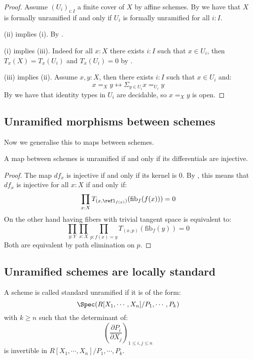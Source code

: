 \begin{proof}
Assume $(U_i)_{i:I}$ a finite cover of $X$ by affine schemes. By  we have that $X$ is formally unramified if and only if $U_i$ is formally unramified for all $i:I$.

(ii) implies (i). By .

(i) implies (iii). Indeed for all $x:X$ there exists $i:I$ such that $x\in U_i$, then $T_x(X) = T_x(U_i)$ and $T_x(U_i) = 0$ by .

(iii) implies (ii). Assume $x,y:X$, then there exists $i:I$ such that $x\in U_i$ and:
\[x=_Xy \leftrightarrow \Sigma_{y\in U_i} x=_{U_i} y\]
By  we have that identity types in $U_i$ are decidable, so $x=_Xy$ is open.
\end{proof}

\subsection{Unramified morphisms between schemes}

Now we generalise this to maps between schemes.

\begin{proposition}\label{unramified-map-characterisation}
A map between schemes is unramified if and only if its differentials are injective. 
\end{proposition}

\begin{proof}
The map $df_x$ is injective if and only if its kernel is $0$. By , this means that $df_x$ is injective for all $x:X$ if and only if:
\[
\prod_{x:X}T_{(x,\refl_{f(x)})}(\mathrm{fib}_f(f(x)))=0
\]
On the other hand having fibers with trivial tangent space is equivalent to:
\[
\prod_{y:Y}\prod_{x:X}\prod_{p:f(x)=y} T_{(x,p)}(\mathrm{fib}_f(y)) = 0
\]
Both are equivalent by path elimination on $p$.
\end{proof}


\subsection{Unramified schemes are locally standard}

\begin{definition}
A scheme is called standard unramified if it is of the form:
\[\Spec(R[X_1,\cdots,X_n]/P_1,\cdots,P_k)\]
with $k\geq n$ such that the determinant of:
\[\left( \frac{\partial P_i}{\partial X_j}\right)_{1\leq i,j\leq n}\]
is invertible in $R[X_1,\cdots,X_n]/P_1,\cdots,P_k$.
\end{definition}

